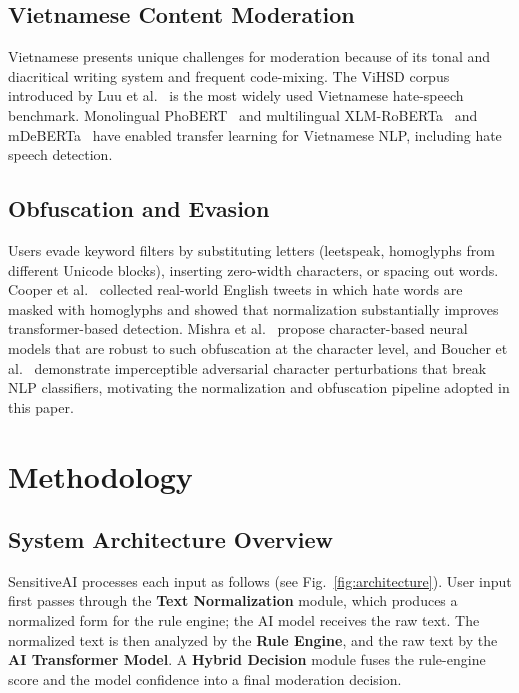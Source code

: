 \documentclass[runningheads]{llncs}
\begin{document}
\subsection{Vietnamese Content Moderation}

Vietnamese presents unique challenges for moderation because of its tonal and diacritical writing system and frequent code-mixing.
The ViHSD corpus introduced by Luu et al.~\cite{luu2021} is the most widely used Vietnamese hate-speech benchmark.
Monolingual PhoBERT~\cite{nguyen2020phobert} and multilingual XLM-RoBERTa~\cite{conneau2020} and mDeBERTa~\cite{he2021deberta,he2023debertav3} have enabled transfer learning for Vietnamese NLP, including hate speech detection.

\subsection{Obfuscation and Evasion}

Users evade keyword filters by substituting letters (leetspeak, homoglyphs from different Unicode blocks), inserting zero-width characters, or spacing out words.
Cooper et al.~\cite{cooper2023} collected real-world English tweets in which hate words are masked with homoglyphs and showed that normalization substantially improves transformer-based detection.
Mishra et al.~\cite{mishra2018} propose character-based neural models that are robust to such obfuscation at the character level, and Boucher et al.~\cite{boucher2022} demonstrate imperceptible adversarial character perturbations that break NLP classifiers, motivating the normalization and obfuscation pipeline adopted in this paper.

\section{Methodology}
\label{sec:method}

\subsection{System Architecture Overview}

SensitiveAI processes each input as follows (see Fig.~\ref{fig:architecture}).
User input first passes through the \textbf{Text Normalization} module, which produces a normalized form for the rule engine; the AI model receives the raw text.
The normalized text is then analyzed by the \textbf{Rule Engine}, and the raw text by the \textbf{AI Transformer Model}.
A \textbf{Hybrid Decision} module fuses the rule-engine score and the model confidence into a final moderation decision.
\end{document}
